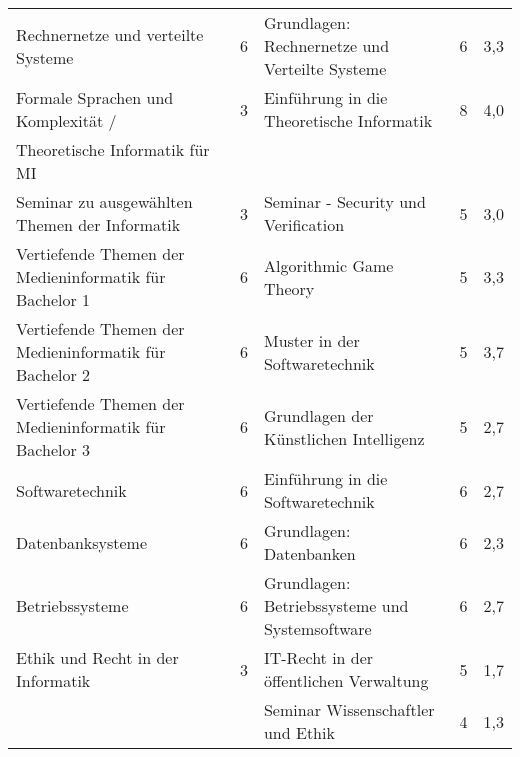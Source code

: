 \documentclass[11pt, a4paper]{awesome-cv}
\begin{document}
\begin{table*}
\begin{tabularx}{\textwidth}{|X|c|X|c|c|}
    Rechnernetze und verteilte Systeme                     & 6    & Grundlagen: Rechnernetze und Verteilte Systeme & 6    & 3,3  \\

    \rowcolor{awesome!25}
    Formale Sprachen und Komplexität /                     & 3    & Einführung in die Theoretische Informatik      & 8    & 4,0  \\
    \rowcolor{awesome!25}
    Theoretische Informatik für MI                         &      &                                                &      &      \\

    Seminar zu ausgewählten Themen der Informatik          & 3    & Seminar - Security und Verification            & 5    & 3,0  \\

    \rowcolor{awesome!25}
    Vertiefende Themen der Medieninformatik für Bachelor 1 & 6    & Algorithmic Game Theory                        & 5    & 3,3  \\

    Vertiefende Themen der Medieninformatik für Bachelor 2 & 6    & Muster in der Softwaretechnik                  & 5    & 3,7  \\

    \rowcolor{awesome!25}
    Vertiefende Themen der Medieninformatik für Bachelor 3 & 6    & Grundlagen der Künstlichen Intelligenz         & 5    & 2,7  \\

    Softwaretechnik                                        & 6    & Einführung in die Softwaretechnik              & 6    & 2,7  \\

    \rowcolor{awesome!25}
    Datenbanksysteme                                       & 6    & Grundlagen: Datenbanken                        & 6    & 2,3  \\

    Betriebssysteme                                        & 6    & Grundlagen: Betriebssysteme und Systemsoftware & 6    & 2,7  \\

    \rowcolor{awesome!25}
    Ethik und Recht in der Informatik                      & 3    & IT-Recht in der öffentlichen Verwaltung        & 5    & 1,7  \\
    \rowcolor{awesome!25}
                                                           &      & Seminar Wissenschaftler und Ethik              & 4    & 1,3  \\


\end{tabularx}
\end{table*}
\end{document}
